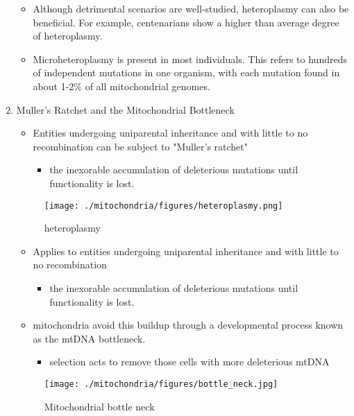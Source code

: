 \documentclass{scrartcl}
\begin{document}
\begin{enumerate}
\begin{itemize}
\item Although detrimental scenarios are well-studied, heteroplasmy can
also be beneficial. For example, centenarians show a higher than
average degree of heteroplasmy.

\item Microheteroplasmy is present in most individuals. This refers to
hundreds of independent mutations in one organism, with each
mutation found in about 1-2\% of all mitochondrial genomes.
\end{itemize}

\item Muller's Ratchet and the Mitochondrial Bottleneck
\label{sec:org7d8dc99}

\begin{itemize}
\item Entities undergoing uniparental inheritance and with little to no
recombination can be subject to "Muller's ratchet"
\begin{itemize}
\item the inexorable accumulation of deleterious mutations until
functionality is lost.
\end{itemize}
\end{itemize}

\begin{figure}[htbp]
\centering
\texttt{[image: ./mitochondria/figures/heteroplasmy.png]}
\caption[heter]{\label{fig:org832882d}
heteroplasmy}
\end{figure}


\begin{itemize}
\item Applies to entities undergoing uniparental inheritance and with little to no
recombination
\begin{itemize}
\item the inexorable accumulation of deleterious mutations until functionality
is lost.
\end{itemize}

\item mitochondria avoid this buildup through a developmental process
known as the mtDNA bottleneck. 
\begin{itemize}
\item selection acts to remove those cells with more deleterious mtDNA
\end{itemize}
\end{itemize}

\begin{figure}[htbp]
\centering
\texttt{[image: ./mitochondria/figures/bottle\_neck.jpg]}
\caption[bottle]{\label{fig:org030bdc7}
Mitochondrial bottle neck}
\end{figure}


\end{enumerate}
\end{document}
